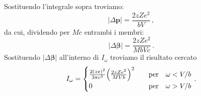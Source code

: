 \documentclass[twoside]{article}
\begin{document}
Sostituendo l'integrale sopra troviamo:
\begin{equation*}
|\Delta \mathbf{p}|=\frac{2zZe^2}{bV} \, ,
\end{equation*}
da cui, dividendo per $Mc$ entrambi i membri:
\begin{equation*}
|\Delta \bm{\beta}|=\frac{2zZe^2}{MbVc} \, .
\end{equation*}
Sostituendo $|\Delta \bm{\beta}|$ all'interno di $I_\omega$ troviamo il risultato cercato
\begin{equation*}
I_\omega=
\begin{cases}
\frac{2(ze)^2}{3\pi c^3} \Bigl( \frac{2zZe^2}{MVb} \Bigr)^2 \quad &\text{per} \quad \omega<V/b \\
0 \quad &\text{per} \quad \omega>V/b \\
\end{cases} \, .
\end{equation*}
\end{document}
